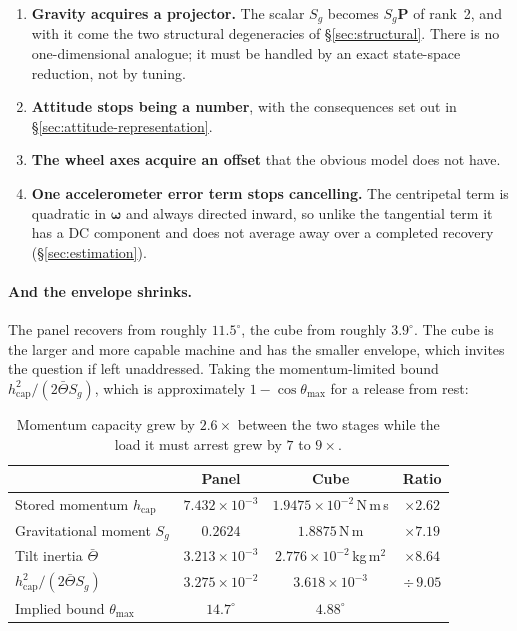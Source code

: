 \begin{enumerate}
  \item \textbf{Gravity acquires a projector.} The scalar $S_g$ becomes
        $S_g\bm{P}$ of rank~2, and with it come the two structural
        degeneracies of \S\ref{sec:structural}. There is no
        one-dimensional analogue; it must be handled by an exact state-space
        reduction, not by tuning.
  \item \textbf{Attitude stops being a number}, with the consequences set out
        in \S\ref{sec:attitude-representation}.
  \item \textbf{The wheel axes acquire an offset} that the obvious model does
        not have.
  \item \textbf{One accelerometer error term stops cancelling.} The
        centripetal term is quadratic in $\bm{\omega}$ and always directed
        inward, so unlike the tangential term it has a DC component and does
        not average away over a completed recovery
        (\S\ref{sec:estimation}).
\end{enumerate}

\paragraph{And the envelope shrinks.} The panel recovers from roughly
$11.5^\circ$, the cube from roughly $3.9^\circ$. The cube is the larger and
more capable machine and has the smaller envelope, which invites the question
if left unaddressed. Taking the momentum-limited bound
$h_{\mathrm{cap}}^2/(2\bar\Theta S_g)$, which is approximately
$1-\cos\theta_{\max}$ for a release from rest:

\begin{table}[htbp]
\centering
\small
\begin{tabular}{@{}lccc@{}}
\toprule
 & \textbf{Panel} & \textbf{Cube} & \textbf{Ratio}\\
\midrule
Stored momentum $h_{\mathrm{cap}}$ & $7.432\times10^{-3}$ & $1.9475\times10^{-2}$\,N\,m\,s & $\times 2.62$\\
Gravitational moment $S_g$ & $0.2624$ & $1.8875$\,N\,m & $\times 7.19$\\
Tilt inertia $\bar{\Theta}$ & $3.213\times10^{-3}$ & $2.776\times10^{-2}$\,kg\,m$^2$ & $\times 8.64$\\
\midrule
$h_{\mathrm{cap}}^2/(2\bar\Theta S_g)$ & $3.275\times10^{-2}$ & $3.618\times10^{-3}$ & $\div\,9.05$\\
Implied bound $\theta_{\max}$ & $14.7^\circ$ & $4.88^\circ$ & \\
\bottomrule
\end{tabular}
\caption{Momentum capacity grew by $2.6\times$ between the two stages while
the load it must arrest grew by $7$ to $9\times$.}
\label{tab:envelope-scaling}
\end{table}

